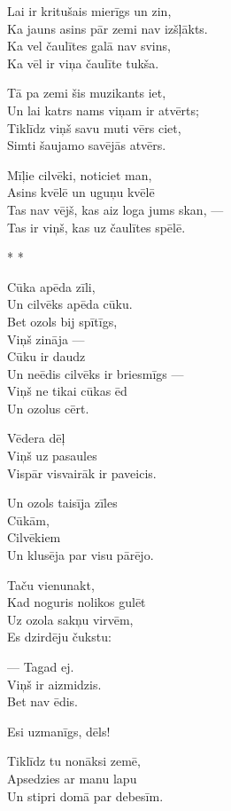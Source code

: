 \documentclass[14pt]{extarticle}
\begin{document}
Lai ir kritušais mierīgs un zin,\\
Ka jauns asins pār zemi nav izšļākts.\\
Ka vel čaulītes galā nav svins,\\
Ka vēl ir viņa čaulīte tukša.

Tā pa zemi šis muzikants iet,\\
Un lai katrs nams viņam ir atvērts;\\
Tiklīdz viņš savu muti vērs ciet,\\
Simti šaujamo savējās atvērs.

Mīļie cilvēki, noticiet man,\\
Asins kvēlē un uguņu kvēlē\\
Tas nav vējš, kas aiz loga jums skan, ---\\
Tas ir viņš, kas uz čaulītes spēlē.


\newpage

{\large \sc * * *}

Cūka apēda zīli,\\
Un cilvēks apēda cūku.\\
Bet ozols bij spītīgs,\\
Viņš zināja ---\\
Cūku ir daudz\\
Un neēdis cilvēks ir briesmīgs ---\\
Viņš ne tikai cūkas ēd\\
Un ozolus cērt.

Vēdera dēļ\\
Viņš uz pasaules\\
Vispār visvairāk ir paveicis.

Un ozols taisīja zīles\\
Cūkām,\\
Cilvēkiem\\
Un klusēja par visu pārējo.

Taču vienunakt,\\
Kad noguris nolikos gulēt\\
Uz ozola sakņu virvēm,\\
Es dzirdēju čukstu:

--- Tagad ej.\\
Viņš ir aizmidzis.\\
Bet nav ēdis.

Esi uzmanīgs, dēls!

Tiklīdz tu nonāksi zemē,\\
Apsedzies ar manu lapu\\
Un stipri domā par debesīm.
\end{document}
